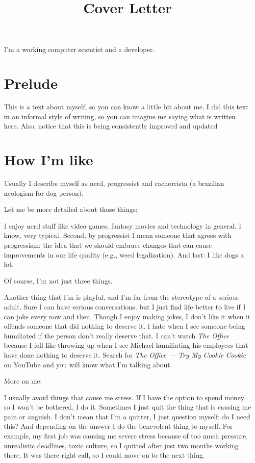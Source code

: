 \documentclass[11pt,a4paper,sans]{moderncv}
\title{Cover Letter}
\begin{document}
\makecvtitle %
I'm a working computer scientist and a developer.

\section{Prelude}
This is a text about myself, so you can know a little bit about me.
I did this text in an informal style of writing, so you can imagine me saying what is written here.
Also, notice that this is being consistently improved and updated

\section{How I'm like}
Usually I describe myself as nerd, progressist and cachorrista (a brazilian neologism for dog person).

Let me be more detailed about those things:

I enjoy nerd stuff like video games, fantasy movies and technology in general.
I know, very typical.
Second, by progressist I mean someone that agrees with progressism: the idea that we should embrace changes that can cause improvements in our life quality (e.g., weed legalization).
And last: I like dogs a lot.

\medskip

Of course, I'm not just three things.

\medskip

Another thing that I'm is playful, and I'm far from the stereotype of a serious adult.
Sure I can have serious conversations, but I just find life better to live if I can joke every now and then.
Though I enjoy making jokes, I don't like it when it offends someone that did nothing to deserve it.
I hate when I see someone being humiliated if the person don't really deserve that.
I can't watch \textit{The Office} because I fell like throwing up when I see Michael humiliating his employees that have done nothing to deserve it.
Search for \textit{The Office — Try My Cookie Cookie} on YouTube and you will know what I'm talking about.

\medskip

More on me:

\medskip

I usually avoid things that cause me stress.
If I have the option to spend money so I won't be bothered, I do it.
Sometimes I just quit the thing that is causing me pain or anguish.
I don't mean that I'm a quitter, I just question myself: do I need this?
And depending on the answer I do the benevolent thing to myself.
For example,  my first job was causing me severe stress because of too much pressure, unrealistic deadlines, toxic culture, so I quitted after just two months working there.
It was there right call, so I could move on to the next thing.
\end{document}
